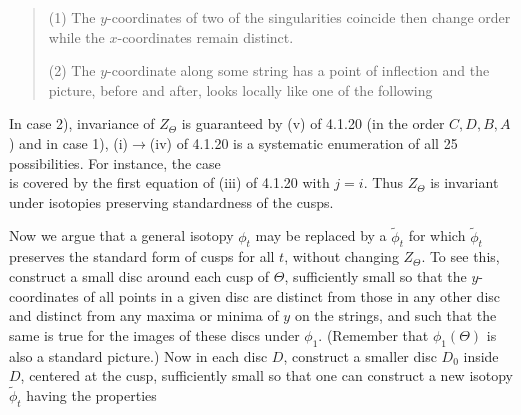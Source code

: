 \begin{verse}
(1) The $y$-coordinates of two of the singularities coincide then
change order while the $x$-coordinates remain distinct.

(2) The $y$-coordinate along some string has a point of
inflection and the picture, before and after, looks locally like
one of the following
\end{verse}
\[
        
\]
In case 2), invariance of $Z_{\Theta}$ is guaranteed by (v) of 4.1.20
(in the order $C,D,B,A$) and in case 1), (i)$\to$(iv) of 4.1.20 is a
systematic enumeration of all 25 possibilities. For instance, the
case
\[
        
\]
\ni is covered by the first equation of (iii) of 4.1.20 with $j=i$.
Thus $Z_{\Theta}$ is invariant under isotopies preserving
standardness of the cusps.

Now we argue that a general isotopy $\phi_t$ may be replaced by a
$\tilde\phi_t$ for which $\tilde\phi_t$ preserves the standard form
of cusps for all $t$, without changing
$Z_{\Theta}$. To see this, construct a small disc around each cusp of
$\Theta$, sufficiently small so that the $y$-coordinates of all
points in a given disc are distinct from those in any other disc
and distinct from any maxima or minima of $y$ on the strings, and
such that the same is true for the images of these discs under
$\phi_1$. (Remember that $\phi_1(\Theta)$ is also a standard picture.)
Now in each disc $D$, construct a smaller disc $D_0$ inside $D$,
centered at the cusp, sufficiently small so that one can construct
a new isotopy $\tilde\phi_t$ having the properties

